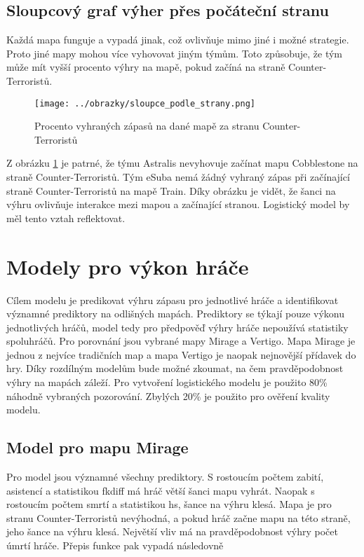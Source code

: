 \newpage
{\color{red}
\subsection{Sloupcový graf výher přes počáteční stranu}
Každá mapa funguje a vypadá jinak, což ovlivňuje mimo jiné i možné strategie. Proto jiné mapy mohou více vyhovovat jiným týmům. Toto způsobuje, že
tým může mít vyšší procento výhry na mapě, pokud začíná na straně Counter-Terroristů.

\begin{figure}[H]
    \centering
    \texttt{[image: ../obrazky/sloupce\_podle\_strany.png]}
    \caption{Procento vyhraných zápasů na dané mapě za stranu Counter-Terroristů} 
    \label{fig:sloupcovy_graf_strany}
\end{figure}

Z obrázku \ref{fig:sloupcovy_graf_strany} je patrné, že týmu Astralis nevyhovuje začínat mapu Cobblestone na straně Counter-Terroristů. Tým eSuba nemá žádný vyhraný zápas
při začínající straně Counter-Terroristů na mapě Train. Díky obrázku je vidět, že šanci na výhru ovlivňuje interakce mezi mapou a začínající stranou. Logistický model
by měl tento vztah reflektovat. 
}

\section{Modely pro výkon hráče}
{\color{red}
Cílem modelu je predikovat výhru zápasu pro jednotlivé hráče a identifikovat významné prediktory na odlišných mapách.
}
Prediktory se týkají pouze výkonu jednotlivých hráčů, model tedy pro předpověď výhry hráče nepoužívá statistiky spoluhráčů. Pro porovnání jsou vybrané mapy Mirage a Vertigo.
Mapa Mirage je jednou z nejvíce tradičních map a mapa Vertigo je naopak nejnovější přídavek do hry. Díky rozdílným modelům bude možné zkoumat, na čem pravděpodobnost výhry na 
mapách záleží. Pro vytvoření logistického modelu je použito 80\% náhodně vybraných pozorování. Zbylých 20\% je použito pro
{\color{red}
ověření kvality modelu.
}

\subsection{Model pro mapu Mirage}



Pro model jsou významné všechny prediktory. S rostoucím počtem zabití, asistencí a statistikou fkdiff má hráč větší šanci mapu vyhrát. Naopak s rostoucím počtem smrtí a 
statistikou hs, šance na výhru klesá. Mapa je pro stranu Counter-Terroristů nevýhodná, a pokud hráč začne mapu na této straně, jeho šance na výhru klesá. Největší vliv
má na pravděpodobnost výhry počet úmrtí hráče. Přepis funkce pak vypadá následovně

